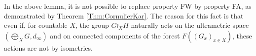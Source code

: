 %

In the above lemma, it is not possible to replace property FW by property FA, as demonstrated by Theorem \ref{Thm:CornulierKar}.
The reason for this fact is that even if, for countable $X$, the group $G\wr_X H$ naturally acts on the ultrametric space $(\bigoplus_X G, d_\infty)$ and on connected components of the forest $F((G_x)_{x\in X})$, these actions are not by isometries.

